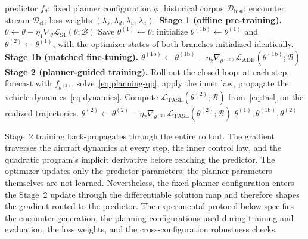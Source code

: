 \documentclass[11pt]{article}
\theoremstyle{plain}
\theoremstyle{definition}
\newcommand{\method}{PlanGrad}
\begin{document}
\begin{algorithm}[t]
	\caption{Training schemes of \method}
	\label{alg:plangrad}
	\begin{algorithmic}[1]
		\Require predictor $f_{\theta}$; fixed planner configuration
		$\phi$; historical corpus $\mathcal{D}_{\mathrm{hist}}$;
		encounter stream $\mathcal{D}_{\mathrm{cl}}$; loss weights
		$(\lambda_s, \lambda_d, \lambda_u, \lambda_a)$.
		\State \textbf{Stage 1 (offline pre-training).}
		\State $\theta \leftarrow \theta
			- \eta_1 \nabla_{\theta}
			\mathcal{L}_{\mathrm{S1}}(\theta; \mathcal{B})$
		\EndFor
		\State Save $\theta^{(1)} \leftarrow \theta$; initialize
		$\theta^{(1\mathrm{b})} \leftarrow \theta^{(1)}$ and
		$\theta^{(2)} \leftarrow \theta^{(1)}$, with the optimizer
		states of both branches initialized identically.
		\State \textbf{Stage 1b (matched fine-tuning).}
		\State $\theta^{(1\mathrm{b})} \leftarrow \theta^{(1\mathrm{b})}
			- \eta_2 \nabla_{\theta^{(1\mathrm{b})}}
			\mathcal{L}_{\mathrm{ADE}}(\theta^{(1\mathrm{b})}; \mathcal{B})$
		\EndFor
		\State \textbf{Stage 2 (planner-guided training).}
		\State Roll out the closed loop: at each step, forecast
		with $f_{\theta^{(2)}}$, solve~\eqref{eq:planning-qp}, apply
		the inner law, propagate the vehicle
		dynamics~\eqref{eq:dynamics}.
		\EndFor
		\State Compute $\mathcal{L}_{\mathrm{TASL}}(\theta^{(2)};
			\mathcal{B})$ from~\eqref{eq:tasl} on the realized
		trajectories.
		\State $\theta^{(2)} \leftarrow \theta^{(2)}
			- \eta_2 \nabla_{\theta^{(2)}}
			\mathcal{L}_{\mathrm{TASL}}(\theta^{(2)}; \mathcal{B})$
		\EndFor
		\State \Return $\theta^{(1)}, \theta^{(1\mathrm{b})},
			\theta^{(2)}$
	\end{algorithmic}
\end{algorithm}
 
Stage~2 training back-propagates through the entire rollout. The
gradient traverses the aircraft dynamics at every step, the inner
control law, and the quadratic program's implicit derivative before
reaching the predictor. The optimizer updates only the predictor
parameters; the planner parameters themselves are not learned.
Nevertheless, the fixed planner configuration enters the Stage~2
update through the differentiable solution map and therefore shapes
the gradient routed to the predictor. The experimental protocol below
specifies the encounter generation, the planning configurations used
during training and evaluation, the loss weights, and the
cross-configuration robustness checks.
 
\end{document}
